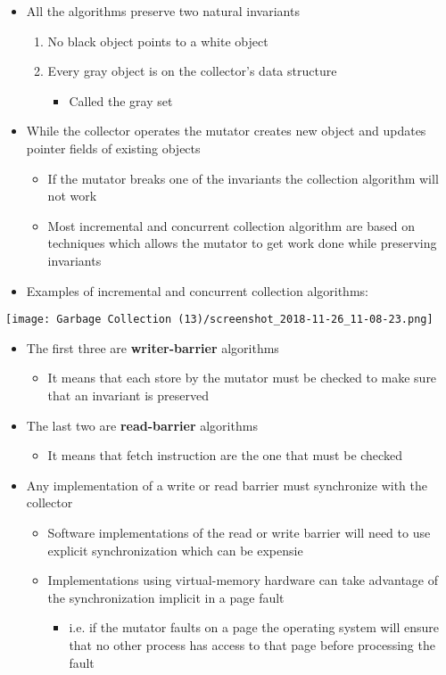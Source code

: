\documentclass[11pt]{article}
\begin{document}
\begin{itemize}
\item All the algorithms preserve two natural invariants
\begin{enumerate}
\item No black object points to a white object
\item Every gray object is on the collector's data structure
\begin{itemize}
\item Called the gray set
\end{itemize}
\end{enumerate}

\item While the collector operates the mutator creates new object and updates pointer fields of existing objects
\begin{itemize}
\item If the mutator breaks one of the invariants the collection algorithm will not work
\item Most incremental and concurrent collection algorithm are based on techniques which allows the mutator to get work done while preserving invariants
\end{itemize}

\item Examples of incremental and concurrent collection algorithms:
\end{itemize}
\begin{center}
\texttt{[image: Garbage Collection (13)/screenshot\_2018-11-26\_11-08-23.png]}
\end{center}
\begin{itemize}
\item The first three are \textbf{writer-barrier} algorithms
\begin{itemize}
\item It means that each store by the mutator must be checked to make sure that an invariant is preserved
\end{itemize}

\item The last two are \textbf{read-barrier} algorithms
\begin{itemize}
\item It means that fetch instruction are the one that must be checked
\end{itemize}

\item Any implementation of a write or read barrier must synchronize with the collector
\begin{itemize}
\item Software implementations of the read or write barrier will need to use explicit synchronization which can be expensie
\item Implementations using virtual-memory hardware can take advantage of the synchronization implicit in a page fault
\begin{itemize}
\item i.e. if the mutator faults on a page the operating system will ensure that no other process has access to that page before processing the fault
\end{itemize}
\end{itemize}
\end{itemize}
\end{document}
